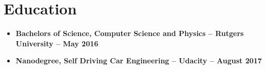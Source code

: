 \documentclass[12pt,a4paper,sans]{moderncv}
\begin{document}
\makecvtitle

\section{Education}
\begin{itemize}
\item{\textbf{Bachelors of Science, Computer Science and Physics -- Rutgers University -- May 2016}} 
\item{\textbf{Nanodegree, Self Driving Car Engineering  -- Udacity -- August 2017}}
\end{itemize}

\end{document}
